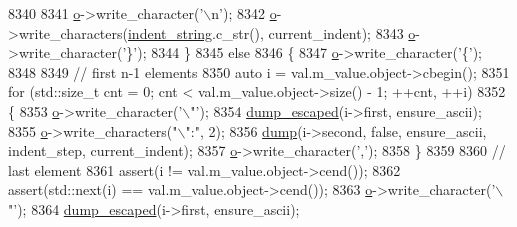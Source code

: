 \begin{DoxyCode}
8340 
8341                     \hyperlink{classnlohmann_1_1detail_1_1serializer_acf3c88660d3cbc65fc71c4d84f2a9f59}{o}->write\_character(\textcolor{charliteral}{'\(\backslash\)n'});
8342                     \hyperlink{classnlohmann_1_1detail_1_1serializer_acf3c88660d3cbc65fc71c4d84f2a9f59}{o}->write\_characters(\hyperlink{classnlohmann_1_1detail_1_1serializer_ae9268a10d88a5526e32735a55a132fc6}{indent\_string}.c\_str(), current\_indent);
8343                     \hyperlink{classnlohmann_1_1detail_1_1serializer_acf3c88660d3cbc65fc71c4d84f2a9f59}{o}->write\_character(\textcolor{charliteral}{'\}'});
8344                 \}
8345                 \textcolor{keywordflow}{else}
8346                 \{
8347                     \hyperlink{classnlohmann_1_1detail_1_1serializer_acf3c88660d3cbc65fc71c4d84f2a9f59}{o}->write\_character(\textcolor{charliteral}{'\{'});
8348 
8349                     \textcolor{comment}{// first n-1 elements}
8350                     \textcolor{keyword}{auto} i = val.m\_value.object->cbegin();
8351                     \textcolor{keywordflow}{for} (std::size\_t cnt = 0; cnt < val.m\_value.object->size() - 1; ++cnt, ++i)
8352                     \{
8353                         \hyperlink{classnlohmann_1_1detail_1_1serializer_acf3c88660d3cbc65fc71c4d84f2a9f59}{o}->write\_character(\textcolor{charliteral}{'\(\backslash\)"'});
8354                         \hyperlink{classnlohmann_1_1detail_1_1serializer_ac1f8d1165b44149bd8be397dce68ea05}{dump\_escaped}(i->first, ensure\_ascii);
8355                         \hyperlink{classnlohmann_1_1detail_1_1serializer_acf3c88660d3cbc65fc71c4d84f2a9f59}{o}->write\_characters(\textcolor{stringliteral}{"\(\backslash\)":"}, 2);
8356                         \hyperlink{classnlohmann_1_1detail_1_1serializer_a95460ebd1a535a543e5a0ec52e00f48b}{dump}(i->second, \textcolor{keyword}{false}, ensure\_ascii, indent\_step, current\_indent);
8357                         \hyperlink{classnlohmann_1_1detail_1_1serializer_acf3c88660d3cbc65fc71c4d84f2a9f59}{o}->write\_character(\textcolor{charliteral}{','});
8358                     \}
8359 
8360                     \textcolor{comment}{// last element}
8361                     assert(i != val.m\_value.object->cend());
8362                     assert(std::next(i) == val.m\_value.object->cend());
8363                     \hyperlink{classnlohmann_1_1detail_1_1serializer_acf3c88660d3cbc65fc71c4d84f2a9f59}{o}->write\_character(\textcolor{charliteral}{'\(\backslash\)"'});
8364                     \hyperlink{classnlohmann_1_1detail_1_1serializer_ac1f8d1165b44149bd8be397dce68ea05}{dump\_escaped}(i->first, ensure\_ascii);

\end{DoxyCode}
